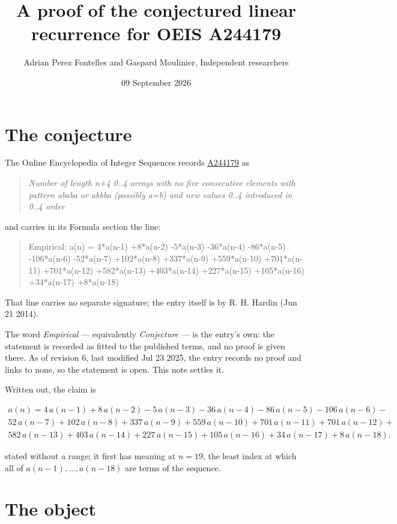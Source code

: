 \documentclass[11pt]{article}
\title{A proof of the conjectured linear recurrence for OEIS A244179}
\author{Adrian Perez Fontelles and Gaspard Moulinier, Independent researchers}
\date{09 September 2026}
\theoremstyle{definition}
\begin{document}
\maketitle
\section{The conjecture}

The Online Encyclopedia of Integer Sequences records \href{https://oeis.org/A244179}{A244179} as

\begin{quote}\itshape Number of length n+4 0..4 arrays with no five consecutive elements with pattern ababa or abbba (possibly a=b) and new values 0..4 introduced in 0..4 order\end{quote}

and carries in its Formula section the line:

\begin{quote}\ttfamily Empirical: a(n) = 4*a(n-1) +8*a(n-2) -5*a(n-3) -36*a(n-4) -86*a(n-5) -106*a(n-6) -52*a(n-7) +102*a(n-8) +337*a(n-9) +559*a(n-10) +701*a(n-11) +701*a(n-12) +582*a(n-13) +403*a(n-14) +227*a(n-15) +105*a(n-16) +34*a(n-17) +8*a(n-18)\end{quote}

That line carries no separate signature; the entry itself is by R. H. Hardin (Jun 21 2014).

The word {\itshape Empirical} --- equivalently {\itshape Conjecture} --- is the entry's own: the statement is recorded as fitted to the published terms, and no proof is given there. As of revision 6, last modified Jul 23 2025, the entry records no proof and links to none, so the statement is open. This note settles it.

Written out, the claim is

\begin{multline*} a(n) = 4\,a(n-1) + 8\,a(n-2) - 5\,a(n-3) - 36\,a(n-4) - 86\,a(n-5) - 106\,a(n-6) - \\ 52\,a(n-7) + 102\,a(n-8) + 337\,a(n-9) + 559\,a(n-10) + 701\,a(n-11) + 701\,a(n-12) + \\ 582\,a(n-13) + 403\,a(n-14) + 227\,a(n-15) + 105\,a(n-16) + 34\,a(n-17) + 8\,a(n-18). \end{multline*}

stated without a range; it first has meaning at $n = 19$, the least index at which all of $a(n-1),\dots,a(n-18)$ are terms of the sequence.

\section{The object}
\end{document}
